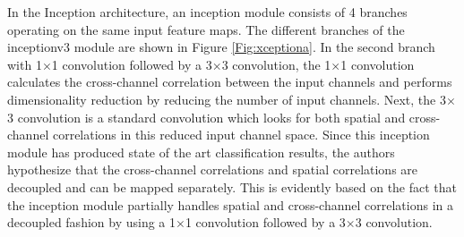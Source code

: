 In the Inception architecture, an inception module consists of 4 branches operating on the same input feature maps. The different branches of the inceptionv3 module are shown in Figure \ref{Fig:xceptiona}. In the second branch with 1$\times$1 convolution followed by a 3$\times$3 convolution, the 1$\times$1 convolution calculates the cross-channel correlation between the input channels and performs dimensionality reduction by reducing the number of input channels. Next, the 3$\times$3 convolution is a standard convolution which looks for both spatial and cross-channel correlations in this reduced input channel space. Since this inception module has produced state of the art classification results, the authors hypothesize that the cross-channel correlations and spatial correlations are decoupled and can be mapped separately. This is evidently based on the fact that the inception module partially handles spatial and cross-channel correlations in a decoupled fashion by using a 1$\times$1 convolution followed by a 3$\times$3 convolution. 

